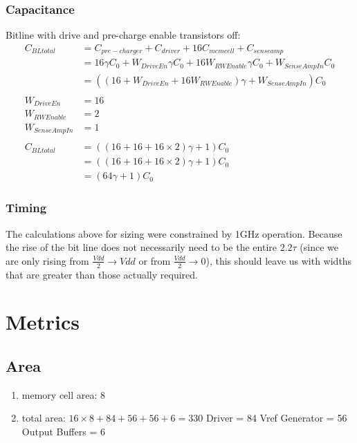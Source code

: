 \documentclass[a4paper]{article}
\begin{document}
\subsubsection{Capacitance}
Bitline with drive and pre-charge enable transistors off:
\begin{align*}
C_{BLtotal} &= C_{pre-charger} + C_{driver} + 16 C_{memcell} + C_{senseamp}\\
&= 16 \gamma C_0 + W_{DriveEn}\gamma C_0 + 16 W_{RWEnable}\gamma C_0 + W_{SenseAmpIn} C_0\\
&= ((16 + W_{DriveEn}  + 16 W_{RWEnable})\gamma + W_{SenseAmpIn})C_0\\\\
W_{DriveEn} &= 16\\
W_{RWEnable} &= 2\\
W_{SenseAmpIn} &= 1\\\\
C_{BLtotal} &= ((16 + 16  + 16 \times 2)\gamma + 1)C_0\\
&= ((16 + 16  + 16 \times 2)\gamma + 1)C_0\\
&= (64\gamma + 1) C_0
\end{align*}

\subsubsection{Timing}
The calculations above for sizing were constrained by 1GHz operation. Because the rise of the bit line does not necessarily need to be the entire $2.2\tau$ (since we are only rising from $\frac{Vdd}{2} \rightarrow Vdd$ or from $\frac{Vdd}{2} \rightarrow 0$), this should leave us with widths that are greater than those actually required.



\section{Metrics}
\label{sec:metrics}

\subsection{Area}
\begin{enumerate}
\item memory cell area: 8
\item total area: $16 \times 8 + 84 + 56 + 56 + 6 = 330$
\subitem Driver = 84
\subitem Vref Generator = 56
\subitem Output Buffers = 6
\end{enumerate}
\end{document}
